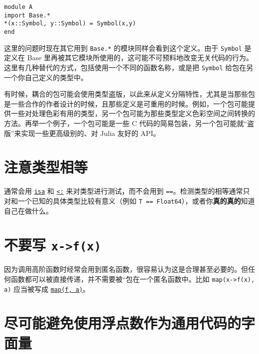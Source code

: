 \begin{verbatim}
module A
import Base.*
*(x::Symbol, y::Symbol) = Symbol(x,y)
end
\end{verbatim}



这里的问题时现在其它用到 \texttt{Base.*} 的模块同样会看到这个定义。由于 \texttt{Symbol} 是定义在 Base 里再被其它模块所使用的，这可能不可预料地改变无关代码的行为。这里有几种替代的方式，包括使用一个不同的函数名称，或是把 \texttt{Symbol} 给包在另一个你自己定义的类型中。



有时候，耦合的包可能会使用类型盗版，以此来从定义分隔特性，尤其是当那些包是一些合作的作者设计的时候，且那些定义是可重用的时候。例如，一个包可能提供一些对处理色彩有用的类型，另一个包可能为那些类型定义色彩空间之间转换的方法。再举一个例子，一个包可能是一些 C 代码的简易包装，另一个包可能就“盗版”来实现一些更高级别的、对 Julia 友好的 API。



\hypertarget{11741910651274288820}{}


\section{注意类型相等}



通常会用 \hyperlink{7066325108767373297}{\texttt{isa}} 和 \hyperlink{6254591906563366276}{\texttt{<:}} 来对类型进行测试，而不会用到 \texttt{==}。检测类型的相等通常只对和一个已知的具体类型比较有意义（例如 \texttt{T == Float64}），或者你\textbf{真的真的}知道自己在做什么。



\hypertarget{20919813611265277}{}


\section{不要写 \texttt{x->f(x)}}



因为调用高阶函数时经常会用到匿名函数，很容易认为这是合理甚至必要的。但任何函数都可以被直接传递，并不需要被“包{\textquotedbl}在一个匿名函数中。比如 \texttt{map(x->f(x), a)} 应当被写成 \hyperlink{11483231213869150535}{\texttt{map(f, a)}}。



\hypertarget{12032676153757060243}{}


\section{尽可能避免使用浮点数作为通用代码的字面量}



